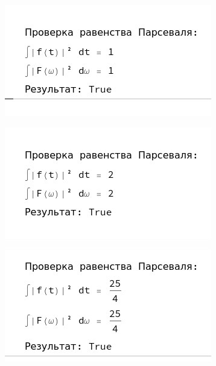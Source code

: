 \documentclass[a4paper,12pt]{article}
\begin{document}
\begin{center}
\begin{minipage}{0.32\textwidth}
  \centering
  \includegraphics[width=\linewidth]{images/5P11.png}
\end{minipage}
\hfill
\begin{minipage}{0.32\textwidth}
  \centering
  \includegraphics[width=\linewidth]{images/5P22.png}
\end{minipage}
\hfill
\begin{minipage}{0.32\textwidth}
  \centering
  \includegraphics[width=\linewidth]{images/5P54.png}
\end{minipage}
\end{center}
\end{document}
